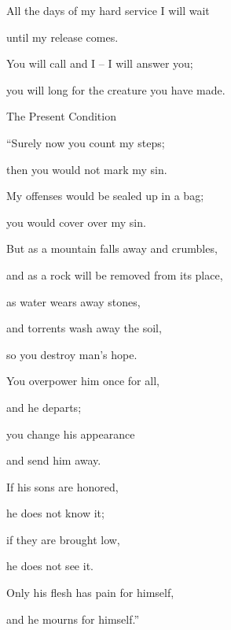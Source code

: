 {\par }{\Q All
the days
of my hard service
I will wait
\par }{\Q until
my release
comes.
\par }{\Q {}You will call
and I –
I will answer
you;
\par }{\Q you will long for the creature you have made.
\par }{\SH The Present Condition
\par }{\Q {}“Surely
now
you count
my steps;
\par }{\Q then you would not
mark my
sin.
\par }{\Q {}My offenses
would be sealed
up in a bag;
\par }{\Q you would cover over
my sin.
\par }{\Q {}But as
a mountain
falls
away
and crumbles,
\par }{\Q and as a rock
will be removed from its place,
\par }{\Q {}as water
wears
away stones,
\par }{\Q and torrents
wash away
the soil,
\par }{\Q so you destroy
man’s
hope.
\par }{\Q {}You overpower
him once for all,
\par }{\Q and he departs;
\par }{\Q you change his appearance
\par }{\Q and send him away.
\par }{\Q {}If his sons
are honored,
\par }{\Q he does not
know
it;

\par }{\Q if they are brought low,
\par }{\Q he does not
see it.
\par }{\Q {}Only
his flesh
has pain
for himself,

\par }{\Q and he mourns
for himself.”

}
